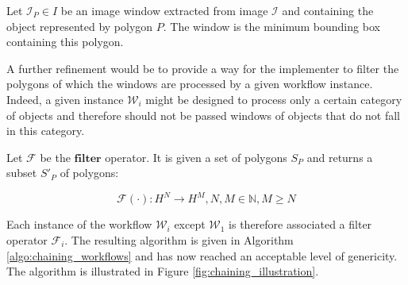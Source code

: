 \begin{definition}\label{def:image_window}
	Let $\mathcal{I}_P \in I$ be an image window extracted from image $\mathcal{I}$ and containing the object represented by polygon $P$. The window is the minimum bounding box containing this polygon.
\end{definition}

A further refinement would be to provide a way for the implementer to filter the polygons of which the windows are processed by a given workflow instance. Indeed, a given instance $\mathcal{W}_i$ might be designed to process only a certain category of objects and therefore should not be passed windows of objects that do not fall in this category. 

\begin{definition}\label{def:filter_op}
	Let $\mathcal{F}$ be the $\textbf{filter}$ operator. It is given a set of polygons $S_P$ and returns a subset $S'_P$ of polygons:
	
	\begin{equation}
		\mathcal{F}(\cdot): H^N \rightarrow H^M, N, M \in \mathbb{N}, M \geq N
	\end{equation}
\end{definition}

Each instance of the workflow $\mathcal{W}_i$ except $\mathcal{W}_1$ is therefore associated a filter operator $\mathcal{F}_i$. The resulting algorithm is given in Algorithm \ref{algo:chaining_workflows} and has now reached an acceptable level of genericity. The algorithm is illustrated in Figure \ref{fig:chaining_illustration}.

